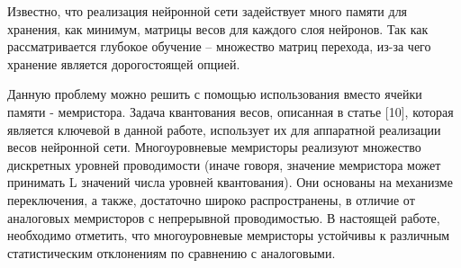 Известно, что реализация нейронной сети задействует много памяти для хранения, как минимум, матрицы весов для каждого слоя нейронов. Так как рассматривается глубокое обучение -- множество матриц перехода, из-за чего хранение является дорогостоящей опцией.

Данную проблему можно решить с помощью использования вместо ячейки памяти - мемристора. Задача квантования весов, описанная в статье [10], которая является ключевой в данной работе, использует их для аппаратной реализации весов нейронной сети. Многоуровневые мемристоры реализуют множество дискретных уровней проводимости (иначе говоря, значение мемристора может принимать L значений числа уровней квантования). Они основаны на механизме переключения, а также, достаточно широко распространены, в отличие от аналоговых мемристоров с непрерывной проводимостью. В настоящей работе, необходимо отметить, что многоуровневые мемристоры устойчивы к различным статистическим отклонениям по сравнению с аналоговыми. 

	\renewcommand{\listalgorithmname}{Список алгоритмов}
	
	\algrenewcommand{}
	\algrenewcommand{}
	\algrenewcommand{}
	\algrenewcommand{}
	\algrenewcommand{}
	\algrenewcommand{}
	\algrenewcommand{}
	\algrenewcommand{}
	\algrenewcommand{}
	\algrenewcommand{}
	\algrenewcommand{}
	\algrenewcommand{}
	\algrenewcommand{}
	\algrenewcommand{}
	\algrenewcommand{}
	\algrenewcommand{}
	
